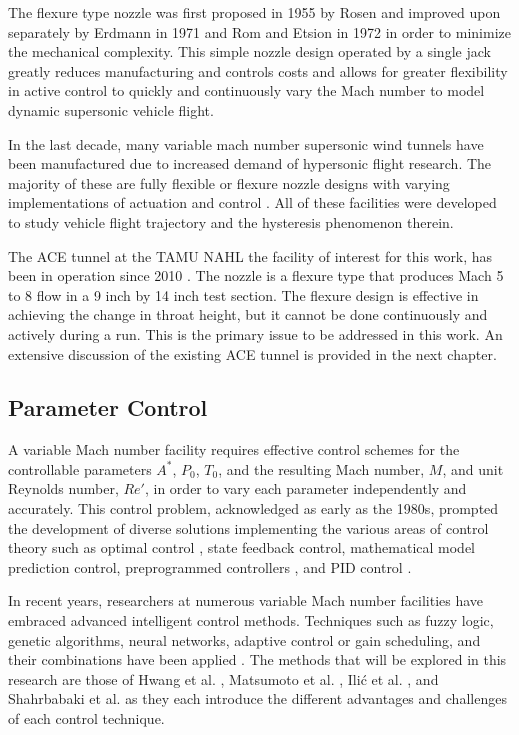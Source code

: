 The flexure type nozzle was first proposed in 1955 by Rosen \cite{rosen} and improved upon separately by Erdmann in 1971\cite{erdmann} and Rom and Etsion in 1972 \cite{erdmann,rom} in order to minimize the mechanical complexity. This simple nozzle design operated by a single jack greatly reduces manufacturing and controls costs and allows for greater flexibility in active control to quickly and continuously vary the Mach number to model dynamic supersonic vehicle flight.

In the last decade, many variable mach number supersonic wind tunnels have been manufactured due to increased demand of hypersonic flight research. The majority of these are fully flexible or flexure nozzle designs with varying implementations of actuation and control \cite{ilic-1,shahrbabaki-1,durand,laguarda,chen,guo,lv,qi,steeves}. All of these facilities were developed to study vehicle flight trajectory and the hysteresis phenomenon therein.

The ACE tunnel at the TAMU NAHL the facility of interest for this work, has been in operation since 2010 \cite{ace09,ace10-calibrate,tichenor-dis}. The nozzle is a flexure type that produces Mach 5 to 8 flow in a 9 inch by 14 inch test section. The flexure design is effective in achieving the change in throat height, but it cannot be done continuously and actively during a run. This is the primary issue to be addressed in this work. An extensive discussion of the existing ACE tunnel is provided in the next chapter.

\subsection{Parameter Control}
A variable Mach number facility requires effective control schemes for the controllable parameters $A^*$, $P_0$, $T_0$, and the resulting Mach number, $M$, and unit Reynolds number, $Re'$, in order to vary each parameter independently and accurately. This control problem, acknowledged as early as the 1980s, prompted the development of diverse solutions implementing the various areas of control theory such as optimal control \cite{kraft,hwang}, state feedback control, mathematical model prediction control, preprogrammed controllers \cite{matsumoto}, and PID control \cite{fung,ilic-2,silva}.

In recent years, researchers at numerous variable Mach number facilities have embraced advanced intelligent control methods. Techniques such as fuzzy logic, genetic algorithms, neural networks, adaptive control or gain scheduling, and their combinations have been applied \cite{nott,shahrbabaki-1}. The methods that will be explored in this research are those of Hwang et al. \cite{hwang}, Matsumoto et al. \cite{matsumoto}, Ili\'c et al. \cite{ilic-2}, and Shahrbabaki et al. \cite{shahrbabaki-1} as they each introduce the different advantages and challenges of each control technique. 

